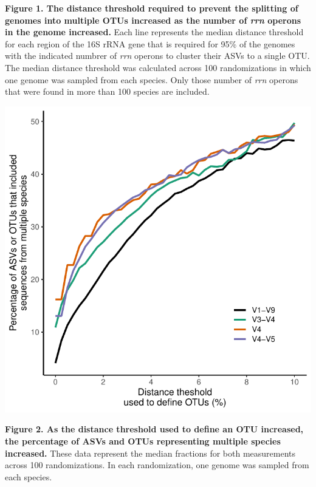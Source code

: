 \documentclass[
]{article}
\begin{document}
\textbf{Figure 1. The distance threshold required to prevent the
splitting of genomes into multiple OTUs increased as the number of
\emph{rrn} operons in the genome increased.} Each line represents the
median distance threshold for each region of the 16S rRNA gene that is
required for 95\% of the genomes with the indicated numbrer of
\emph{rrn} operons to cluster their ASVs to a single OTU. The median
distance threshold was calculated across 100 randomizations in which one
genome was sampled from each species. Only those number of \emph{rrn}
operons that were found in more than 100 species are included.

\newpage

\includegraphics{../figures/lump_split.pdf}

\textbf{Figure 2. As the distance threshold used to define an OTU
increased, the percentage of ASVs and OTUs representing multiple species
increased.} These data represent the median fractions for both
measurements across 100 randomizations. In each randomization, one
genome was sampled from each species.

\newpage
\end{document}
